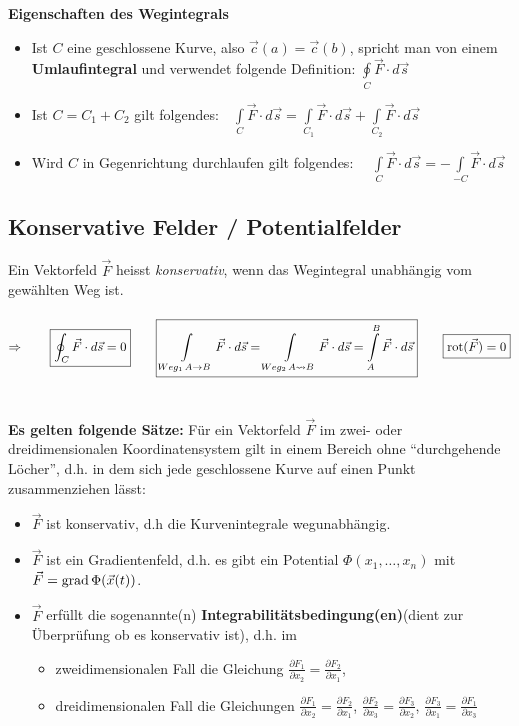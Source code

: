   \textbf{Eigenschaften des Wegintegrals}
  \begin{itemize}
    \item Ist $C$ eine geschlossene Kurve, also $\vec{c}(a)=\vec{c}(b)$, spricht
    man von einem \textbf{Umlaufintegral} und verwendet folgende Definition:
    $\oint\limits_C \vec{F}\cdot d\vec{s}$
    \item Ist $C=C_1+C_2$ gilt folgendes:$\quad\int\limits_C \vec{F}\cdot
    d\vec{s}=\int\limits_{C_1} \vec{F}\cdot d\vec{s}+\int\limits_{C_2}
    \vec{F}\cdot d\vec{s}$
    \item Wird $C$ in Gegenrichtung durchlaufen gilt folgendes:
    $\quad\int\limits_C \vec{F}\cdot
    d\vec{s}=-\int\limits_{-C} \vec{F}\cdot d\vec{s}$
  \end{itemize}

\subsection{Konservative Felder / Potentialfelder}
  Ein Vektorfeld $\vec{F}$ heisst \textit{konservativ}, wenn das Wegintegral
  unabhängig vom gewählten Weg ist.\\\\
  $\Rightarrow\qquad \boxed{\oint_C \vec{F}\cdot d\vec{s}=0}\qquad\boxed{
  \int\limits_{Weg_1\, A\rightarrow B} \vec{F}\cdot d\vec{s}=\int\limits_{Weg_2\,
  A\leadsto B} \vec{F}\cdot d\vec{s}=\int\limits_A^B \vec{F}\cdot
  d\vec{s}}\qquad\boxed{\operatorname{rot} (\vec{F})=0}$\\\\\\	
  \textbf{Es gelten folgende Sätze:}
  Für ein Vektorfeld $\vec{F}$ im zwei- oder dreidimensionalen Koordinatensystem
  gilt in einem Bereich ohne "`durchgehende Löcher"', d.h. in dem sich jede
  geschlossene Kurve auf einen Punkt zusammenziehen lässt:
  \begin{itemize}
    \item $\vec{F}$ ist konservativ, d.h die Kurvenintegrale wegunabhängig.
    \item $\vec{F}$ ist ein Gradientenfeld, d.h. es gibt ein Potential
    $\Phi(x_1,\ldots,x_n)$ mit $\vec{F}=\operatorname{grad} \Phi(\vec{x}(t))$.
    \item $\vec{F}$ erfüllt die sogenannte(n)
    \textbf{Integrabilitätsbedingung(en)}(dient zur Überprüfung ob es konservativ ist), d.h. im
    \begin{itemize}
      \item zweidimensionalen Fall die Gleichung $\frac{\partial F_1}{\partial
      x_2}=\frac{\partial F_2}{\partial x_1}$,
      \item dreidimensionalen Fall die Gleichungen $\frac{\partial F_1}{\partial
      x_2}=\frac{\partial F_2}{\partial x_1}$, $\frac{\partial F_2}{\partial
      x_3}=\frac{\partial F_3}{\partial x_2}$, $\frac{\partial F_3}{\partial
      x_1}=\frac{\partial F_1}{\partial x_3}$
    \end{itemize}
  \end{itemize}
